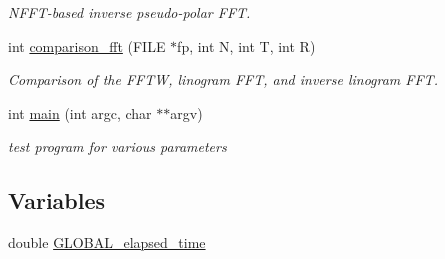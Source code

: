 \begin{CompactItemize}
\begin{CompactList}\small\item\em NFFT-based inverse pseudo-polar FFT. \item\end{CompactList}\item 
\hypertarget{group__applications__polarFFT__linogramm_gc2a323224e3346e37714575d49c65432}{
int \hyperlink{group__applications__polarFFT__linogramm_gc2a323224e3346e37714575d49c65432}{comparison\_\-fft} (FILE $\ast$fp, int N, int T, int R)}
\label{group__applications__polarFFT__linogramm_gc2a323224e3346e37714575d49c65432}

\begin{CompactList}\small\item\em Comparison of the FFTW, linogram FFT, and inverse linogram FFT. \item\end{CompactList}\item 
\hypertarget{group__applications__polarFFT__linogramm_g3c04138a5bfe5d72780bb7e82a18e627}{
int \hyperlink{group__applications__polarFFT__linogramm_g3c04138a5bfe5d72780bb7e82a18e627}{main} (int argc, char $\ast$$\ast$argv)}
\label{group__applications__polarFFT__linogramm_g3c04138a5bfe5d72780bb7e82a18e627}

\begin{CompactList}\small\item\em test program for various parameters \item\end{CompactList}\end{CompactItemize}
\subsection*{Variables}
\begin{CompactItemize}
\item 
\hypertarget{group__applications__polarFFT__linogramm_g89f1a3516fab4c4d4d274df955af639b}{
double \hyperlink{group__applications__polarFFT__linogramm_g89f1a3516fab4c4d4d274df955af639b}{GLOBAL\_\-elapsed\_\-time}}
\label{group__applications__polarFFT__linogramm_g89f1a3516fab4c4d4d274df955af639b}

\end{CompactItemize}
